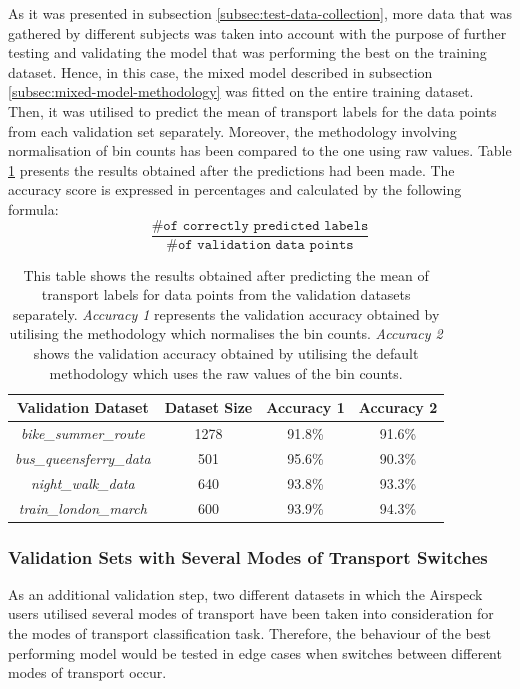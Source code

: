 \documentclass[bsc,frontabs,twoside,singlespacing, parskip,deptreport]{infthesis}     %
\begin{document}
As it was presented in subsection \ref{subsec:test-data-collection}, more data that was gathered by different subjects was taken into account with the purpose of further testing and validating the model that was performing the best on the training dataset. Hence, in this case, the mixed model described in subsection \ref{subsec:mixed-model-methodology} was fitted on the entire training dataset. Then, it was utilised to predict the mean of transport labels for the data points from each validation set separately. Moreover, the methodology involving normalisation of bin counts has been compared to the one using raw values. Table \ref{table:validation-results} presents the results obtained after the predictions had been made. The accuracy score is expressed in percentages and calculated by the following formula: $$ \frac{\texttt{\# of correctly predicted labels}}{\texttt{\# of validation data points}} $$

\begin{table}[h!]
\centering
 \begin{tabular}{|| c | c | c | c ||} 
 \hline
 Validation Dataset & Dataset Size & Accuracy 1 & Accuracy 2 \\ [0.5ex] 
 \hline\hline
 \textit{bike\_summer\_route} & 1278 &  91.8\% & 91.6\% \\ 
 \hline
 \textit{bus\_queensferry\_data} & 501 & 95.6\% & 90.3\% \\ 
 \hline
 \textit{night\_walk\_data} & 640 & 93.8\% & 93.3\% \\
 \hline
 \textit{train\_london\_march} & 600 & 93.9\% & 94.3\% \\ 
 \hline
\end{tabular}
\caption{This table shows the results obtained after predicting the mean of transport labels for data points from the validation datasets separately. \textit{Accuracy 1} represents the validation accuracy obtained by utilising the methodology which normalises the bin counts. \textit{Accuracy 2} shows the validation accuracy obtained by utilising the default methodology which uses the raw values of the bin counts.}
\label{table:validation-results}
\end{table}

\subsubsection*{Validation Sets with Several Modes of Transport Switches}

As an additional validation step, two different datasets in which the Airspeck users utilised several modes of transport have been taken into consideration for the modes of transport classification task. Therefore, the behaviour of the best performing model would be tested in edge cases when switches between different modes of transport occur.
\end{document}
